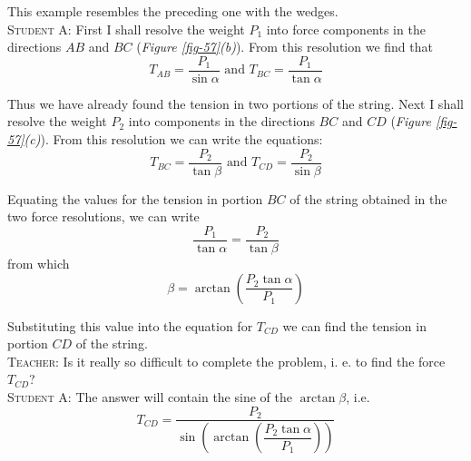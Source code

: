 \documentclass[a4paper,sfsidenotes]{tufte-book}
\begin{document}
This example resembles the preceding one with the wedges.
\\
\textsc{Student A:} First I shall resolve the weight $P_{1}$ into force components in the directions $AB$ and $BC$ (\emph{Figure \ref{fig-57}(b)}). From this resolution we find that \\
\begin{equation*}
T_{AB} = \frac{P_{1}}{\sin \alpha} \, \, \text{and} \, \, T_{BC} = \frac{P_{1}}{\tan \alpha}
\end{equation*}

Thus we have already found the tension in two portions of the string. Next I shall resolve the weight $P_{2}$ into components in the directions $BC$ and $CD$ (\emph{Figure \ref{fig-57}(c)}). From this resolution we can write the equations: \\
\begin{equation*}
T_{BC} = \frac{P_{2}}{\tan \beta} \, \, \text{and} \, \, T_{CD} = \frac{P_{2}}{\sin \beta}
\end{equation*}

Equating the values for the tension in portion $BC$ of the string obtained in the two force resolutions, we can write\\
\begin{equation*}
\frac{P_{1}}{\tan \alpha} =  \frac{P_{2}}{\tan \beta}
\end{equation*}
 from which \\
\begin{equation*}
\beta = \arctan \left( \frac{P_{2} \tan \alpha}{P_{1}} \right)
\end{equation*}

Substituting this value into the equation for $T_{CD}$ we can find the tension in portion $CD$ of the string.
\\
\textsc{Teacher:} Is it really so difficult to complete the problem, i. e. to find the force $T_{CD}$?
\\
\textsc{Student A:} The answer will contain the sine of the $\arctan \beta$, i.e.
\\
\begin{equation*}
T_{CD} = \frac{P_{2}}{\sin \left( \arctan \left( \dfrac {P_{2} \tan \alpha}{P_{1}} \right) \right)}
\end{equation*}
\end{document}
